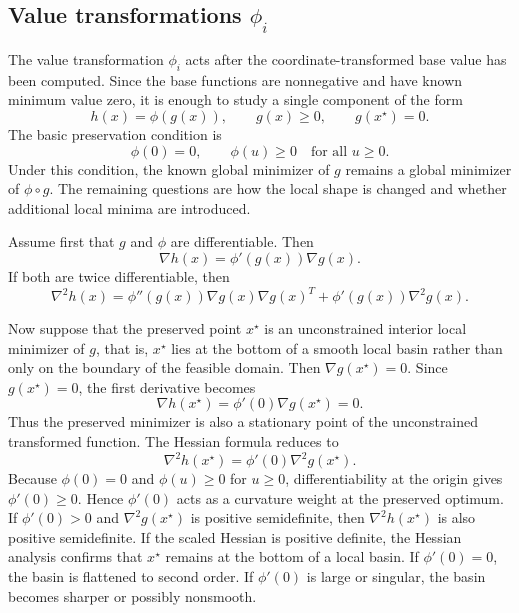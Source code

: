 \documentclass[journal]{IEEEtran}
\theoremstyle{remark}
\theoremstyle{plain}
\begin{document}
\subsection{\texorpdfstring{Value transformations \(\phi_i\)}{Value transformations phi i}}
\label{subsec:value-transformations}

The value transformation \(\phi_i\) acts after the coordinate-transformed base
value has been computed. Since the base functions are nonnegative and have
known minimum value zero, it is enough to study a single component of the form
\[
	h(x)=\phi(g(x)),
	\qquad
	g(x)\ge0,
	\qquad
	g(x^\star)=0.
\]
The basic preservation condition is
\[
	\phi(0)=0,
	\qquad
	\phi(u)\ge0
	\quad\text{for all }u\ge0.
\]
Under this condition, the known global minimizer of \(g\) remains a global
minimizer of \(\phi\circ g\). The remaining questions are how the local shape is
changed and whether additional local minima are introduced.

Assume first that \(g\) and \(\phi\) are differentiable. Then
\begin{equation}
	\nabla h(x)
	=
	\phi'(g(x))\nabla g(x).
	\label{eq:value-transform-gradient}
\end{equation}
If both are twice differentiable, then
\begin{equation}
	\nabla^2 h(x)
	=
	\phi''(g(x))\nabla g(x)\nabla g(x)^T
	+
	\phi'(g(x))\nabla^2 g(x).
	\label{eq:value-transform-hessian}
\end{equation}


Now suppose that the preserved point \(x^\star\) is an unconstrained interior
local minimizer of \(g\), that is, \(x^\star\) lies at the bottom of a smooth
local basin rather than only on the boundary of the feasible domain. Then
\(\nabla g(x^\star)=0\). Since \(g(x^\star)=0\), the first derivative becomes
\[
	\nabla h(x^\star)
	=
	\phi'(0)\nabla g(x^\star)
	=
	0.
\]
Thus the preserved minimizer is also a stationary point of the unconstrained
transformed function. The Hessian formula reduces to
\begin{equation}
	\nabla^2 h(x^\star)
	=
	\phi'(0)\nabla^2 g(x^\star).
	\label{eq:value-transform-hessian-minimizer}
\end{equation}
Because \(\phi(0)=0\) and \(\phi(u)\ge0\) for \(u\ge0\), differentiability at
the origin gives \(\phi'(0)\ge0\). Hence \(\phi'(0)\) acts as a curvature
weight at the preserved optimum. If \(\phi'(0)>0\) and
\(\nabla^2 g(x^\star)\) is positive semidefinite, then
\(\nabla^2 h(x^\star)\) is also positive semidefinite. If the scaled Hessian is
positive definite, the Hessian analysis confirms that \(x^\star\) remains at
the bottom of a local basin. If \(\phi'(0)=0\), the basin is flattened to
second order. If \(\phi'(0)\) is large or singular, the basin becomes sharper
or possibly nonsmooth.
\end{document}
